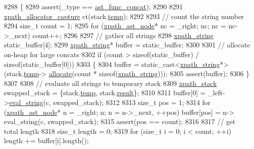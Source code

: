 \begin{DoxyCode}
8288         \{
8289             assert(\_type == \hyperlink{pugixml_8cpp_a11258a240266b84b6b0526930e5d330da2b60b6562585b1e6f1bb2b60901503a7}{ast\_func\_concat});
8290 
8291             \hyperlink{structxpath__allocator__capture}{xpath\_allocator\_capture} ct(stack.\hyperlink{structxpath__stack_a48edd585dfb910c6c016559f07fea0d8}{temp});
8292 
8293             \textcolor{comment}{// count the string number}
8294             \textcolor{keywordtype}{size\_t} count = 1;
8295             \textcolor{keywordflow}{for} (\hyperlink{classxpath__ast__node}{xpath\_ast\_node}* nc = \_right; nc; nc = nc->\_next) count++;
8296 
8297             \textcolor{comment}{// gather all strings}
8298             \hyperlink{classxpath__string}{xpath\_string} static\_buffer[4];
8299             \hyperlink{classxpath__string}{xpath\_string}* buffer = static\_buffer;
8300 
8301             \textcolor{comment}{// allocate on-heap for large concats}
8302             \textcolor{keywordflow}{if} (count > \textcolor{keyword}{sizeof}(static\_buffer) / \textcolor{keyword}{sizeof}(static\_buffer[0]))
8303             \{
8304                 buffer = \textcolor{keyword}{static\_cast<}\hyperlink{classxpath__string}{xpath\_string}*\textcolor{keyword}{>}(stack.\hyperlink{structxpath__stack_a48edd585dfb910c6c016559f07fea0d8}{temp}->
      \hyperlink{classxpath__allocator_aad95aa445f2fdc7c3d1c19b1f3d67cb1}{allocate}(count * \textcolor{keyword}{sizeof}(\hyperlink{classxpath__string}{xpath\_string})));
8305                 assert(buffer);
8306             \}
8307 
8308             \textcolor{comment}{// evaluate all strings to temporary stack}
8309             \hyperlink{structxpath__stack}{xpath\_stack} swapped\_stack = \{stack.\hyperlink{structxpath__stack_a48edd585dfb910c6c016559f07fea0d8}{temp}, stack.\hyperlink{structxpath__stack_adce164b779cbb3d1bc093a772067ea7e}{result}\};
8310 
8311             buffer[0] = \_left->\hyperlink{classxpath__ast__node_a6b675237a590548b68d0e0b97518b6df}{eval\_string}(c, swapped\_stack);
8312 
8313             \textcolor{keywordtype}{size\_t} pos = 1;
8314             \textcolor{keywordflow}{for} (\hyperlink{classxpath__ast__node}{xpath\_ast\_node}* n = \_right; n; n = n->\_next, ++pos) buffer[pos] = n->
      eval\_string(c, swapped\_stack);
8315             assert(pos == count);
8316 
8317             \textcolor{comment}{// get total length}
8318             \textcolor{keywordtype}{size\_t} length = 0;
8319             \textcolor{keywordflow}{for} (\textcolor{keywordtype}{size\_t} i = 0; i < count; ++i) length += buffer[i].length();

\end{DoxyCode}
